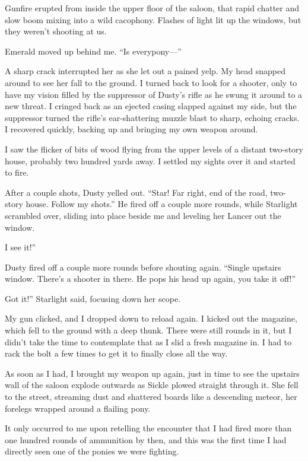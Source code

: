 Gunfire erupted from inside the upper floor of the saloon, that rapid chatter and slow boom mixing into a wild cacophony. Flashes of light lit up the windows, but they weren’t shooting at us.

Emerald moved up behind me. “Is everypony—”

A sharp crack interrupted her as she let out a pained yelp. My head snapped around to see her fall to the ground. I turned back to look for a shooter, only to have my vision filled by the suppressor of Dusty’s rifle as he swung it around to a new threat. I cringed back as an ejected casing slapped against my side, but the suppressor turned the rifle’s ear-shattering muzzle blast to sharp, echoing cracks. I recovered quickly, backing up and bringing my own weapon around.

I saw the flicker of bits of wood flying from the upper levels of a distant two-story house, probably two hundred yards away. I settled my sights over it and started to fire.

After a couple shots, Dusty yelled out. “Star! Far right, end of the road, two-story house. Follow my shots.” He fired off a couple more rounds, while Starlight scrambled over, sliding into place beside me and leveling her Lancer out the window.

\leavevmode{}I see it!”

Dusty fired off a couple more rounds before shouting again. “Single upstairs window. There’s a shooter in there. He pops his head up again, you take it off!”

\leavevmode{}Got it!” Starlight said, focusing down her scope.

My gun clicked, and I dropped down to reload again. I kicked out the magazine, which fell to the ground with a deep thunk. There were still rounds in it, but I didn’t take the time to contemplate that as I slid a fresh magazine in. I had to rack the bolt a few times to get it to finally close all the way.

As soon as I had, I brought my weapon up again, just in time to see the upstairs wall of the saloon explode outwards as Sickle plowed straight through it. She fell to the street, streaming dust and shattered boards like a descending meteor, her forelegs wrapped around a flailing pony.

It only occurred to me upon retelling the encounter that I had fired more than one hundred rounds of ammunition by then, and this was the first time I had directly seen one of the ponies we were fighting.

